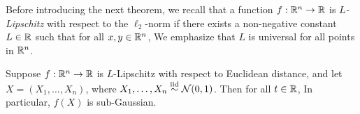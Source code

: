 Before introducing the next theorem, we recall that a function $f : \mathbb R^n \to \mathbb R$ is \emph{$L$-Lipschitz} with respect to the $\ell_2$-norm if there exists a non-negative constant $L \in \mathbb R$ such that for all $x, y \in \mathbb R^n$,
We emphasize that $L$ is universal for all points in $\mathbb R^n$.

\begin{theorem}
    Suppose $f : \mathbb R^n \to \mathbb R$ is $L$-Lipschitz with respect to Euclidean distance, and let $X = (X_1, \ldots, X_n)$, where $X_1, \ldots, X_n \overset{\textup{iid}}{\sim} \mathcal N(0, 1)$. Then for all $t \in \mathbb R$,
In particular, $f(X)$ is sub-Gaussian.
\end{theorem}
